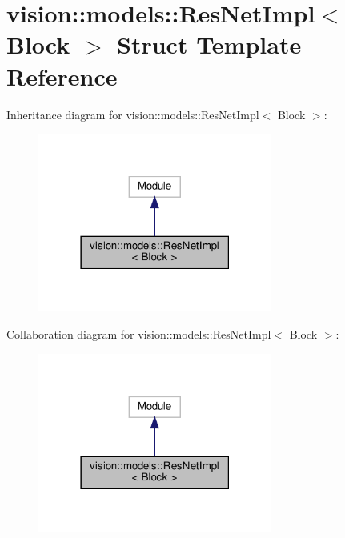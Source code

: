 \hypertarget{structvision_1_1models_1_1ResNetImpl}{}\section{vision\+:\+:models\+:\+:Res\+Net\+Impl$<$ Block $>$ Struct Template Reference}
\label{structvision_1_1models_1_1ResNetImpl}


Inheritance diagram for vision\+:\+:models\+:\+:Res\+Net\+Impl$<$ Block $>$\+:
\nopagebreak
\begin{figure}[H]
\begin{center}
\leavevmode
\includegraphics[width=218pt]{structvision_1_1models_1_1ResNetImpl__inherit__graph}
\end{center}
\end{figure}


Collaboration diagram for vision\+:\+:models\+:\+:Res\+Net\+Impl$<$ Block $>$\+:
\nopagebreak
\begin{figure}[H]
\begin{center}
\leavevmode
\includegraphics[width=218pt]{structvision_1_1models_1_1ResNetImpl__coll__graph}
\end{center}
\end{figure}
